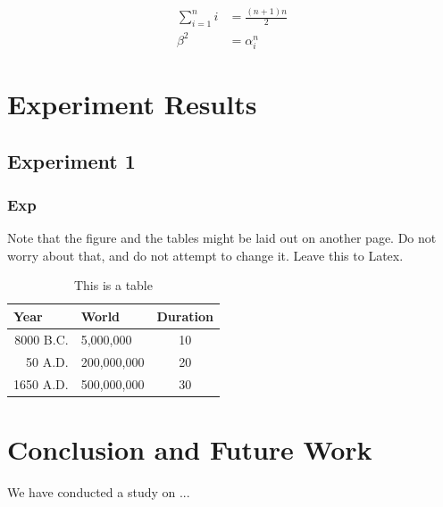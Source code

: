 \documentclass{svproc}
\begin{document}
    \begin{align}
        \label{eq:sum_i}
        \sum_{i=1}^n i &= \frac{(n+1)n}{2} \\  
        \nonumber
        \beta ^2 &= \alpha_i^n
    \end{align}

\section{Experiment Results}
    \subsection{Experiment 1}
        \subsubsection{Exp}
    Note that the figure and the tables might be laid out on another page. Do not worry about that, and do not attempt to change it. Leave this to Latex.
    
    
    \begin{table}
        \caption{This is a table}
        \begin{center}
            \begin{tabular}{rlc}
                \hline
                \multicolumn{1}{l}{Year}&\multicolumn{1}{l}{World}&\multicolumn{1}{l}{Duration}\\
                \hline
                8000 B.C.  &     5,000,000 &  10\\
                  50 A.D.  &   200,000,000 &  20\\
                1650 A.D.  &   500,000,000 &  30\\
                \hline
            \end{tabular}
        \end{center}
    \end{table}

\section{Conclusion and Future Work}
We have conducted a study on ...

\printbibliography 
\end{document}
